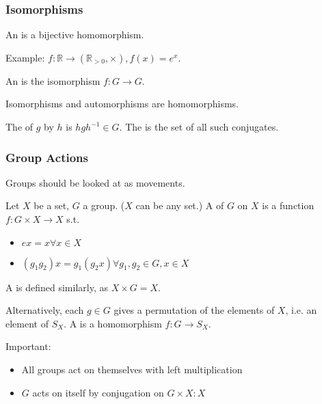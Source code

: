 \documentclass{scrartcl}
\begin{document}
\subsubsection{Isomorphisms}
\begin{definition}
	An  is a bijective homomorphism.
\end{definition}
Example: $f : \mathbb{R} \rightarrow (\mathbb{R}_{>0}, \times), f(x) = e^x$.

\begin{definition}
	An  is the isomorphism $f : G \rightarrow G$.
\end{definition}

Isomorphisms and automorphisms are homomorphisms.

\begin{definition}
	The  of $g$ by $h$ is $hgh^{-1} \in G$. The  is the set of all such conjugates.
\end{definition}

\subsubsection{Group Actions}
Groups should be looked at as movements.

\begin{definition}
	Let $X$ be a set, $G$ a group. ($X$ can be any set.) A  of $G$ on $X$ is a function $f : G \times X \rightarrow X$ s.t. 
	\begin{itemize}
		\item $ex = x \forall x \in X$
		\item $(g_1g_2)x = g_1(g_2 x) \forall g_1,g_2 \in G, x \in X$
	\end{itemize}
	A  is defined similarly, as $X \times G = X$.
\end{definition}

\begin{definition}
	Alternatively, each $g \in G$ gives a permutation of the elements of $X$, i.e. an element of $S_X$. A  is a homomorphism $f : G \rightarrow S_X$.
\end{definition}

Important: \\
\begin{itemize}
	\item All groups act on themselves with left multiplication
	\item $G$ acts on itself by conjugation on $G \times X : X$
\end{itemize}
\end{document}
